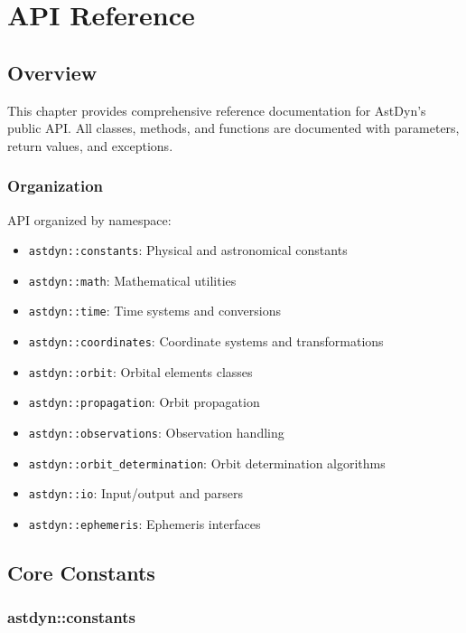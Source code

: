 \chapter{API Reference}
\label{ch:api_reference}

\section{Overview}

This chapter provides comprehensive reference documentation for AstDyn's public API. All classes, methods, and functions are documented with parameters, return values, and exceptions.

\subsection{Organization}

API organized by namespace:

\begin{itemize}
    \item \texttt{astdyn::constants}: Physical and astronomical constants
    \item \texttt{astdyn::math}: Mathematical utilities
    \item \texttt{astdyn::time}: Time systems and conversions
    \item \texttt{astdyn::coordinates}: Coordinate systems and transformations
    \item \texttt{astdyn::orbit}: Orbital elements classes
    \item \texttt{astdyn::propagation}: Orbit propagation
    \item \texttt{astdyn::observations}: Observation handling
    \item \texttt{astdyn::orbit\_determination}: Orbit determination algorithms
    \item \texttt{astdyn::io}: Input/output and parsers
    \item \texttt{astdyn::ephemeris}: Ephemeris interfaces
\end{itemize}

\section{Core Constants}

\subsection{astdyn::constants}

